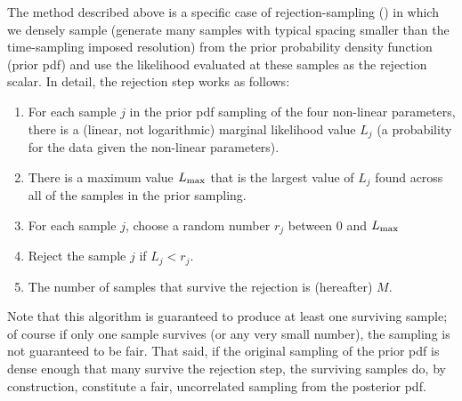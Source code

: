 \documentclass[manuscript, letterpaper]{aastex6}
\newcommand{\resp}[1]{#1}
\begin{document}
\resp{The method described above is a specific case of} rejection-sampling
(\citealt{VonNeumann:1951}) in which we densely sample
(\resp{generate many samples with typical spacing smaller than the time-sampling
imposed resolution}) from the prior probability density function (prior pdf) and
use the likelihood evaluated at these samples as the rejection scalar.
In detail, the rejection step works as follows:
\begin{enumerate}\itemsep0ex
\item For each sample $j$ in the prior pdf sampling of the four non-linear
  parameters, there is a (linear, not logarithmic) \resp{marginal} likelihood
  value $L_j$ (a probability for the data given the \resp{non-linear}
  parameters).
\item There is a maximum value $L_{\rm max}$ that is the largest value of
  $L_j$ found across all of the samples in the prior sampling.
\item For each sample $j$, choose a random number $r_j$ between 0 and
  $L_{\rm max}$
\item Reject the sample $j$ if $L_j < r_j$.
\item The number of samples that survive the rejection is (hereafter) $M$.
\end{enumerate}
Note that this algorithm is guaranteed to produce at least one
surviving sample; of course if only one sample survives (or any very
small number), the sampling is not guaranteed to be fair.
That said, if the original sampling of the prior pdf is dense enough
that many survive the rejection step, the surviving samples do, by construction,
constitute a fair, uncorrelated sampling from the posterior pdf.
\end{document}
